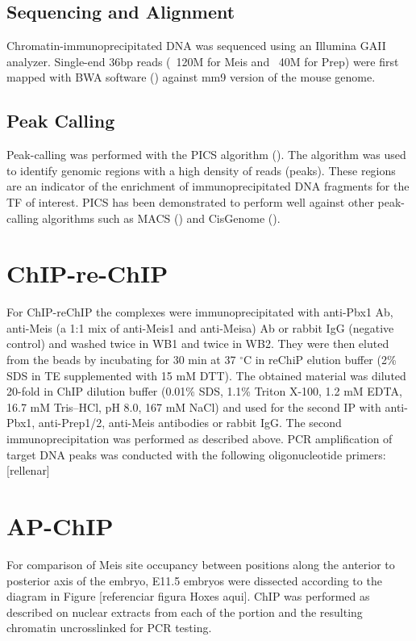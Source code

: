 \subsection{Sequencing and Alignment}

Chromatin-immunoprecipitated DNA was sequenced using an Illumina GAII analyzer. Single-end 36bp reads (~120M for Meis and ~40M for Prep) were first mapped with BWA software (\cite{Li2009}) against mm9 version of the mouse genome.

\subsection{Peak Calling}

Peak-calling was performed with the \ac{PICS} algorithm (\cite{Zhang2011}). The algorithm was used to identify genomic regions with a high density of reads (peaks). These regions are an indicator of the enrichment of immunoprecipitated DNA fragments for the \ac{TF} of interest. \ac{PICS} has been demonstrated to perform well against other peak-calling algorithms such as \ac{MACS} (\cite{Zhang2008}) and CisGenome (\cite{Ji2011}).

\section{ChIP-re-ChIP}

For ChIP-reChIP the complexes were immunoprecipitated with anti-Pbx1 Ab, anti-Meis (a 1:1 mix of anti-Meis1 and anti-Meisa) Ab or rabbit IgG (negative control) and washed twice in WB1 and twice in WB2. They were then eluted from the beads by incubating for 30 min at 37 $^\circ$C in reChiP elution buffer (2\% SDS in TE supplemented with 15 mM DTT). The obtained material was diluted 20-fold in ChIP dilution buffer (0.01\% SDS, 1.1\% Triton X-100, 1.2 mM EDTA, 16.7 mM Tris–HCl, pH 8.0, 167 mM NaCl) and used for the second IP with anti-Pbx1, anti-Prep1/2, anti-Meis antibodies or rabbit IgG. The second immunoprecipitation was performed as described above. \ac{PCR} amplification of target DNA peaks was conducted with the following oligonucleotide primers: [rellenar]

\section{AP-ChIP}

For comparison of Meis site occupancy between positions along the anterior to posterior axis of the embryo, E11.5 embryos were dissected according to the diagram in  Figure [referenciar figura Hoxes aqui]. ChIP was performed as described on nuclear extracts from each of the portion and the resulting chromatin uncrosslinked for \ac{PCR} testing.

